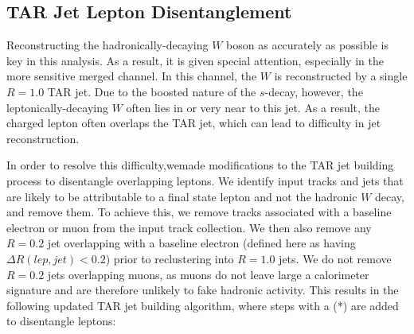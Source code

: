 \subsection{TAR Jet Lepton Disentanglement}
\label{subsection:disent}
Reconstructing the hadronically-decaying $W$ boson as accurately as possible is key in this analysis. As a result, it is given special attention, especially in the more sensitive merged channel. In this channel, the $W$ is reconstructed by a single $R=1.0$ TAR jet. Due to the boosted nature of the $s$-decay, however, the leptonically-decaying $W$ often lies in or very near to this jet. As a result, the charged lepton often overlaps the TAR jet, which can lead to difficulty in jet reconstruction.

In order to resolve this difficulty,wemade modifications to the TAR jet building process to disentangle overlapping leptons. We identify input tracks and jets that are likely to be attributable to a final state lepton and not the hadronic $W$ decay, and remove them. To achieve this, we remove tracks associated with a baseline electron or muon from the input track collection. We then also remove any \akt $R=0.2$ jet overlapping with a baseline electron (defined here as having $\Delta R(lep,jet) < 0.2$) prior to reclustering into $R=1.0$ jets. We do not remove $R=0.2$ jets overlapping muons, as muons do not leave large a calorimeter signature and are therefore unlikely to fake hadronic activity. This results in the following updated TAR jet building algorithm, where steps with a (*) are added to disentangle leptons:

